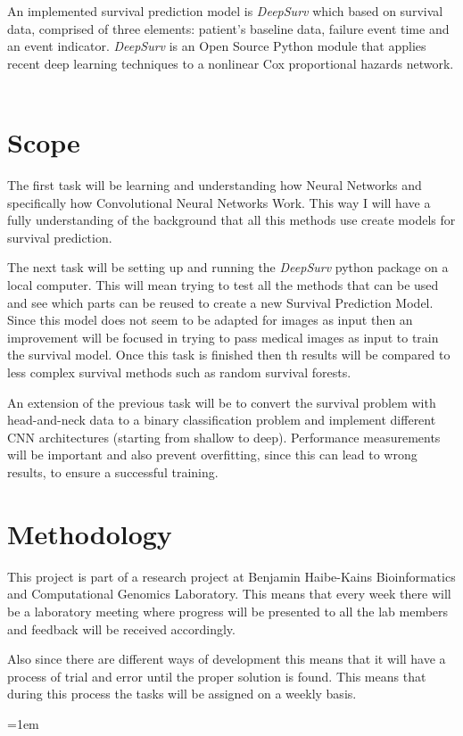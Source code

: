 \documentclass[a4paper, 12pt]{article}
\begin{document}
An implemented survival prediction model is \emph{DeepSurv} which based on survival data,
comprised of three elements: patient's baseline data, failure event time and an event indicator.
\emph{DeepSurv} is an Open Source Python module that applies recent deep learning techniques to
a nonlinear Cox proportional hazards network. 
~\cite{DeepSurv}

\section{Scope}

The first task will be learning and understanding how Neural Networks and specifically how 
Convolutional Neural Networks Work. This way I will have a fully understanding of the background
that all this methods use create models for survival prediction.

The next task will be setting up and running the \emph{DeepSurv} python package on a local computer.
This will mean trying to test all the methods that can be used and see which parts can be reused 
to create a new Survival Prediction Model. Since this model does not seem to be adapted for images
as input then an improvement will be focused in trying to pass medical images as input to train
the survival model. Once this task is finished then th results will be compared to less complex
survival methods such as random survival forests.

An extension of the previous task will be to convert the survival problem with head-and-neck data
to a binary classification problem and implement different CNN architectures (starting from 
shallow to deep). Performance measurements will be important and also prevent overfitting, since 
this can lead to wrong results, to ensure a successful training.

\section{Methodology}

This project is part of a research project at Benjamin Haibe-Kains Bioinformatics and 
Computational Genomics Laboratory. This means that every week there will be a laboratory meeting
where progress will be presented to all the lab members and feedback will be received accordingly. 

Also since there are different ways of development this means that it will have a process of trial
and error until the proper solution is found. This means that during this process the
tasks will be assigned on a weekly basis.

\pagebreak
\emergencystretch=1em
\printbibliography{}
\end{document}
